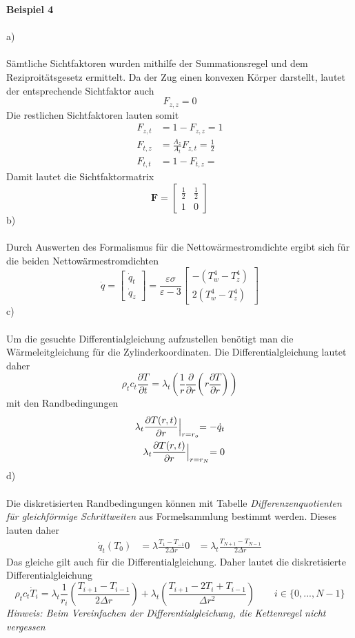 \newpage
\noindent
\textbf{Beispiel 4}\\ \\
a)\\ \\
Sämtliche Sichtfaktoren wurden mithilfe der Summationsregel und dem Reziproitätsgesetz ermittelt. Da der Zug einen konvexen Körper darstellt, lautet der entsprechende Sichtfaktor auch
\[
	F_{z,z} = 0
\]
Die restlichen Sichtfaktoren lauten somit
\begin{align*}
	F_{z,t} &= 1 - F_{z,z} = 1 \\
	F_{t,z} &= \frac{A_z}{A_t}F_{z,t} = \frac{1}{2} \\
	F_{t,t} &= 1 - F_{t,z} = 
\end{align*}
Damit lautet die Sichtfaktormatrix
\[
	\textbf{F} = \begin{bmatrix}
		\frac{1}{2} & \frac{1}{2} \\
		1 & 0
	\end{bmatrix}
\]
b) \\ \\
Durch Auswerten des Formalismus für die Nettowärmestromdichte ergibt sich für die beiden Nettowärmestromdichten
\[
	\dot{q} = \begin{bmatrix}
		\dot{q}_t \\
		\dot{q}_z
	\end{bmatrix}
	=
	\frac{\varepsilon\sigma}{\varepsilon - 3}\begin{bmatrix}
		-(T_w^4 - T_z^4) \\
		2(T_w^4 - T_z^4)
	\end{bmatrix}
\]
c) \\ \\ 
Um die gesuchte Differentialgleichung aufzustellen benötigt man die Wärmeleitgleichung für die Zylinderkoordinaten.
Die Differentialgleichung lautet daher
\[
	\rho_tc_t\frac{\partial T}{\partial t} = \lambda_t\left(\frac{1}{r}\frac{\partial}{\partial r}\left(r\frac{\partial T}{\partial r}\right)\right)
\]
mit den Randbedingungen
\begin{align*}
	\lambda_t\frac{\partial T(r,t)}{\partial r}\Bigl|_{r = r_o} = -\dot{q}_t \\
	\lambda_t\frac{\partial T(r,t)}{\partial r}\Bigl|_{r = r_N} = 0
\end{align*}
d)\\ \\
Die diskretisierten Randbedingungen können mit Tabelle \textit{Differenzenquotienten für gleichförmige Schrittweiten} aus Formelsammlung bestimmt werden. Dieses lauten daher
\begin{align}
	\dot{q}_t(T_0) &= \lambda\frac{T_1 - T_{-1}}{2\Delta r}
	0 &= \lambda_t\frac{T_{N+1} - T_{N-1}}{2\Delta r}
\end{align}
Das gleiche gilt auch für die Differentialgleichung. Daher lautet die diskretisierte Differentialgleichung
\[
	\rho_tc_t\dot{T}_i = \lambda_t\frac{1}{r_i}\left(\frac{T_{i+1} - T_{i-1}}{2\Delta r}\right) + \lambda_t\left(\frac{T_{i+1} - 2T_i + T_{i-1}}{\Delta r^2}\right) \qquad i\in\{0,...,N-1\}
\]
\textit{Hinweis: Beim Vereinfachen der Differentialgleichung, die Kettenregel nicht vergessen}